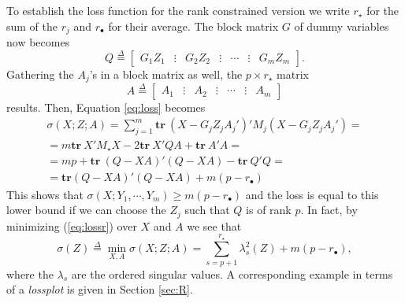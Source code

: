 \documentclass[article, nojss]{jss}
\newcommand{\defi}{\mathop{=}\limits^{\Delta}}
\begin{document}
To establish the loss function for the rank constrained version we write $r_\star$ for the sum of the $r_j$ and $r_\bullet$ for their average. The block matrix $G$ of dummy variables now becomes 
\begin{equation}
Q\defi\begin{bmatrix}G_1Z_1&\vdots&G_2Z_2&\vdots&\cdots&\vdots&G_mZ_m\end{bmatrix}.
\end{equation}
Gathering the $A_j$'s in a block matrix as well, the $p \times r_\star$ matrix
\begin{equation}
A\defi\begin{bmatrix}A_1&\vdots&A_2&\vdots&\cdots&\vdots&A_m\end{bmatrix}
\end{equation}
results. Then, Equation \ref{eq:loss} becomes
\begin{eqnarray}
\label{eq:lossr}
\sigma(X;Z;A)=\sum_{j=1}^m\mathbf{tr}\ (X-G_jZ_jA_j')'M_j(X-G_jZ_jA_j')=\nonumber \\
=m\mathbf{tr}\ X'M_\star X-2\mathbf{tr}\ X'QA+\mathbf{tr}\ A'A=\nonumber \\
=mp+\mathbf{tr}\ (Q-XA)'(Q-XA)-\mathbf{tr}\ Q'Q=\nonumber \\
=\mathbf{tr}(Q-XA)'(Q-XA)+m(p-r_\bullet) 
\end{eqnarray}
This shows that $\sigma(X;Y_1,\cdots,Y_m)\geq m(p-r_\bullet)$ and the loss is equal to
this lower bound if we can choose the $Z_j$ such that $Q$ is of rank $p$. In fact, by
minimizing (\ref{eq:lossr}) over $X$ and $A$ we see that
\begin{equation}
\sigma(Z)\defi\min_{X,A}\sigma(X;Z;A)=
\sum_{s=p+1}^{r_\star}\lambda_s^2(Z)+m(p-r_\bullet),
\end{equation}
where the $\lambda_s$ are the ordered singular values. A corresponding example in terms of a \emph{lossplot} is given in Section \ref{sec:R}.
\end{document}
